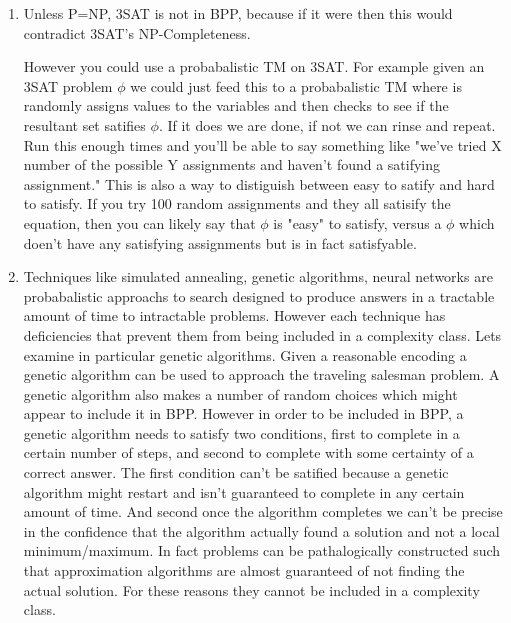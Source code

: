 \documentclass[11pt,fleqn]{article}
\begin{document}
\begin{enumerate}
\item
Unless P=NP, 3SAT is not in BPP, because if it were then this would contradict 3SAT's NP-Completeness. 

However you could use a probabalistic TM on 3SAT. For example given an 3SAT problem $\phi$ we could just feed this to a probabalistic TM where is randomly assigns values to the variables and then checks to see if the resultant set satifies $\phi$. If it does we are done, if not we can rinse and repeat. Run this enough times and you'll be able to say something like "we've tried X number of the possible Y assignments and haven't found a satifying assignment." This is also a way to distiguish between easy to satify and hard to satisfy. If you try 100 random assignments and they all satisify the equation, then you can likely say that $\phi$ is "easy" to satisfy, versus a $\phi$ which doen't have any satisfying assignments but is in fact satisfyable.     

\item 
Techniques like simulated annealing, genetic algorithms, neural networks are probabalistic approachs to search designed to produce answers in a tractable amount of time to intractable problems. However each technique has deficiencies that prevent them from being included in a complexity class. Lets examine in particular genetic algorithms. Given a reasonable encoding a genetic algorithm can be used to approach the traveling salesman problem. A genetic algorithm also makes a number of random choices which might appear to include it in BPP. However in order to be included in BPP, a genetic algorithm needs to satisfy two conditions, first to complete in a certain number of steps, and second to complete with some certainty of a correct answer. The first condition can't be satified because a genetic algorithm might restart and isn't guaranteed to complete in any certain amount of time. And second once the algorithm completes we can't be precise in the confidence that the algorithm actually found a solution and not a local minimum/maximum. In fact problems can be pathalogically constructed such that approximation algorithms are almost guaranteed of not finding the actual solution. For these reasons they cannot be included in a complexity class. 


\end{enumerate}
\end{document}
